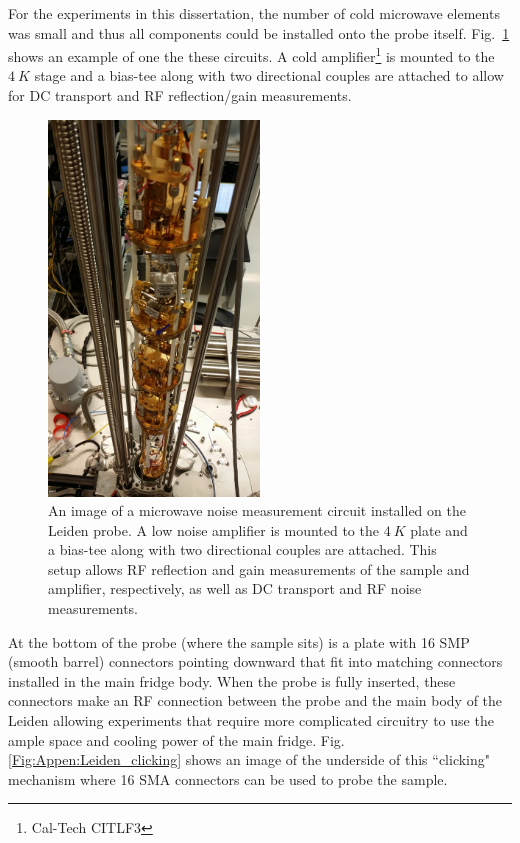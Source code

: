 For the experiments in this dissertation, the number of cold microwave elements was small and thus all components could be installed onto the probe itself. Fig.~\ref{Fig:Appen:Leiden_probe} shows an example of one the these circuits. A cold amplifier\footnote{Cal-Tech CITLF$3$} is mounted to the $4~K$ stage and a bias-tee along with two directional couples are attached to allow for DC transport and RF reflection/gain measurements.

\begin{figure}
\centering
\includegraphics[angle=-90,width = 0.5\textwidth]{figures/appendix/cryostats/Leiden_probe.jpg}
\caption{An image of a microwave noise measurement circuit installed on the Leiden probe. A low noise amplifier is mounted to the $4~K$ plate and a bias-tee along with two directional couples are attached. This setup allows RF reflection and gain measurements of the sample and amplifier, respectively, as well as DC transport and RF noise measurements.}
\label{Fig:Appen:Leiden_probe}
\end{figure}

At the bottom of the probe (where the sample sits) is a plate with 16 SMP (smooth barrel) connectors pointing downward that fit into matching connectors installed in the main fridge body. When the probe is fully inserted, these connectors make an RF connection between the probe and the main body of the Leiden allowing experiments that require more complicated circuitry to use the ample space and cooling power of the main fridge. Fig. \ref{Fig:Appen:Leiden_clicking} shows an image of the underside of this ``clicking" mechanism where 16 SMA connectors can be used to probe the sample.

